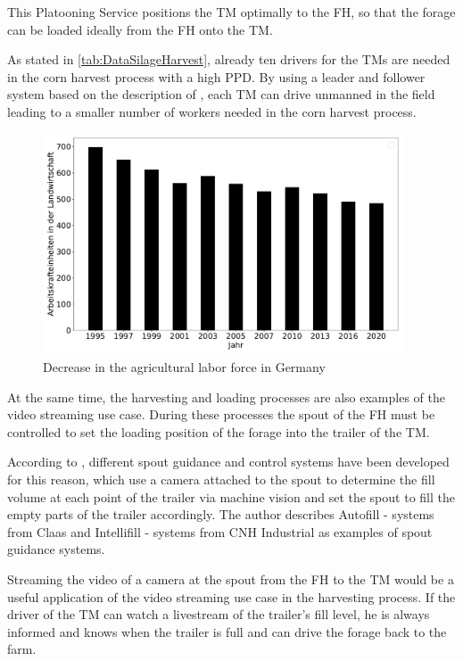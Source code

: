 \documentclass[]{nsm-thesis}
\begin{document}
This Platooning Service positions the \ac{TM} optimally to the \ac{FH}, so that the forage can be loaded ideally from the \ac{FH} onto the \ac{TM}.

As stated in \autoref{tab:DataSilageHarvest}, already ten drivers for the \ac{TM}s are needed in the corn harvest process with a high \ac{PPD}. 
By using a leader and follower system based on the description of \textcite{zhang_method_2009}, each \ac{TM} can drive unmanned in the field leading to a smaller number of workers needed in the corn harvest process.

\begin{figure}%
	\centering
	\includegraphics[width=0.95\textwidth]{figures/AKLandwirtschaft.pdf}
	\caption{Decrease in the agricultural labor force in Germany \cite{bmel2020}}%
	\label{fig:workforce_agri}%
\end{figure}


At the same time, the harvesting and loading processes are also examples of the video streaming use case. During these processes the spout of the \ac{FH} must be controlled to set the loading position of the forage into the trailer of the \ac{TM}.

According to \textcite{murcia_quadrotor_2014}, different spout guidance and control systems have been developed for this reason, which use a camera attached to the spout to determine the fill volume at each point of the trailer via machine vision and set the spout to fill the empty parts of the trailer accordingly. The author describes Autofill - systems from Claas and Intellifill - systems from CNH Industrial as examples of spout guidance systems. 

Streaming the video of a camera at the spout from the \ac{FH} to the \ac{TM} would be a useful application of the video streaming use case in the harvesting process. If the driver of the \ac{TM} can watch a livestream of the trailer's fill level, he is always informed and knows when the trailer is full and can drive the forage back to the farm.
\end{document}
